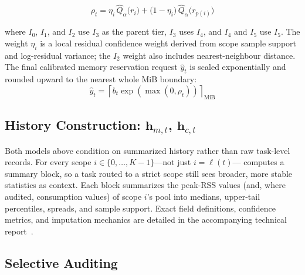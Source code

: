 \begin{equation} \rho_t = \eta_{i}\, \widehat{Q}_{\alpha}\big(r_{i}\big) + \big(1-\eta_{i}\big)\, \widehat{Q}_{\alpha}\big(r_{p(i)}\big) \label{eq:blended_residual} \end{equation}

where $I_0$, $I_1$, and $I_2$ use $I_3$ as the parent tier, $I_3$ uses $I_4$, and $I_4$ and $I_5$ use $I_5$. The weight $\eta_i$ is a local residual confidence weight derived from scope sample support and log-residual variance; the $I_2$ weight also includes nearest-neighbour distance. The final calibrated memory reservation request $\hat{y}_t$ is scaled exponentially and rounded upward to the nearest whole MiB boundary:
\begin{equation} \hat{y}_t = \left\lceil b_t \exp(\max(0, \rho_t)) \right\rceil_{\mathrm{MiB}} \label{eq:final_rounded_allocation} \end{equation}


\subsection{History Construction: $\mathbf{h}_{m,t}$, $\mathbf{h}_{c,t}$}
\label{sec:history}

Both models above condition on summarized history rather than raw
task-level records. For every scope $i \in \{0,\dots,K-1\}$---not just
$i=\ell(t)$---\toolname{} computes a summary block, so a task routed to a
strict scope still sees broader, more stable statistics as context. Each
block summarizes the peak-RSS values (and, where audited, consumption
values) of scope $i$'s pool into medians, upper-tail percentiles, spreads,
and sample support. 
Exact field definitions, confidence metrics, and imputation
mechanics are detailed in the accompanying technical
report~\cite{camp2026techreport}.

\subsection{Selective Auditing}
\label{sec:gates}


